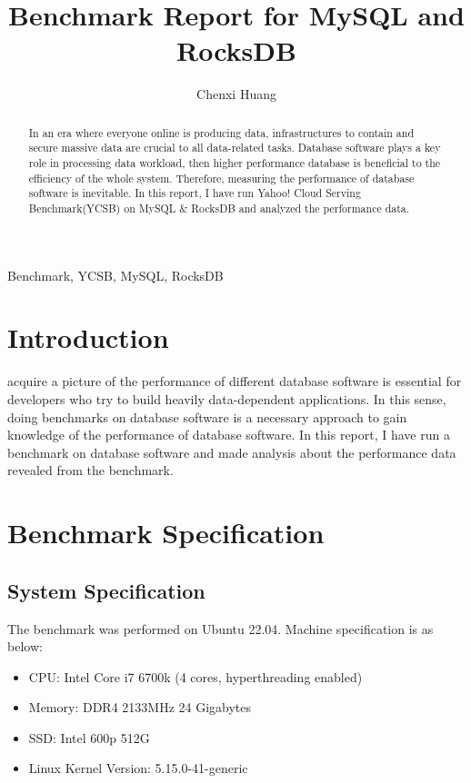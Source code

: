 \documentclass[journal]{IEEEtran}
\begin{document}
\title{Benchmark Report for MySQL and RocksDB}

\author{Chenxi Huang}

\maketitle

\begin{abstract}
In an era where everyone online is producing data, infrastructures to contain and secure massive data are crucial to all data-related tasks. Database software plays a key role in processing data workload, then higher performance database is beneficial to the efficiency of the whole system. Therefore, measuring the performance of database software is inevitable. In this report, I have run Yahoo! Cloud Serving Benchmark(YCSB) on MySQL \& RocksDB and analyzed the performance data.
\end{abstract}

\begin{IEEEkeywords}
Benchmark, YCSB, MySQL, RocksDB
\end{IEEEkeywords}

\IEEEpeerreviewmaketitle

\section{Introduction}

 acquire a picture of the performance of different database software is essential for developers who try to build heavily data-dependent applications. In this sense, doing benchmarks on database software is a necessary approach to gain knowledge of the performance of database software. In this report, I have run a benchmark on database software and made analysis about the performance data revealed from the benchmark.

\section{Benchmark Specification}

\subsection{System Specification}

The benchmark was performed on Ubuntu 22.04. Machine specification is as below:

\begin{itemize}
\item CPU: Intel Core i7 6700k (4 cores, hyperthreading enabled)
\item Memory: DDR4 2133MHz 24 Gigabytes
\item SSD: Intel 600p 512G
\item Linux Kernel Version: 5.15.0-41-generic
\end{itemize}
\end{document}
